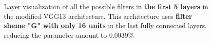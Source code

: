 \begin{figure}[!h]
\centering
\caption{Layer visualization of all the possible filters in \textbf{the first 5 layers} in the modified VGG13 architecture. This architecture uses \textbf{filter sheme "G" with only 16 units} in the last fully connected layers, reducing the parameter amount to 0.0039\%}


\end{figure}
